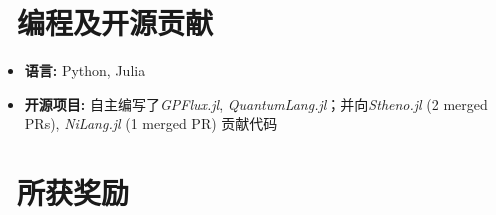 \documentclass{resume}
\begin{document}
\section{\faCogs\ 编程及开源贡献}
\begin{itemize}[parsep=0.5ex]
  \item \textbf{语言:} Python, Julia
  \item \textbf{开源项目:} 自主编写了\textit{GPFlux.jl}, \textit{QuantumLang.jl}；并向\textit{Stheno.jl} (2 merged PRs), \textit{NiLang.jl} (1 merged PR) 贡献代码
\end{itemize}

\section{\faHeartO\ 所获奖励}
\end{document}
